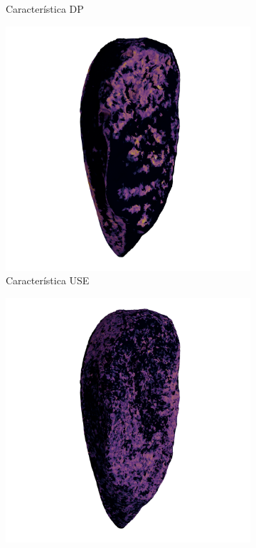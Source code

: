 \begin{figure}[p]
\begin{subfigure}{0.4\textwidth}
        \caption{Característica DP}
        \label{fig5:grad_dp}
    \end{subfigure}
    \begin{subfigure}{0.4\textwidth}
        \centering
        \includegraphics[width=\linewidth]{../../scripts/misc/grad-cam/53-L/53-L_use_left.png}
        \caption{Característica USE}
        \label{fig5:grad_use}
    \end{subfigure}
    \begin{subfigure}{0.4\textwidth}
        \centering
        \includegraphics[width=\linewidth]{../../scripts/misc/grad-cam/53-L/53-L_vm_left.png}

\end{subfigure}
\end{figure}
